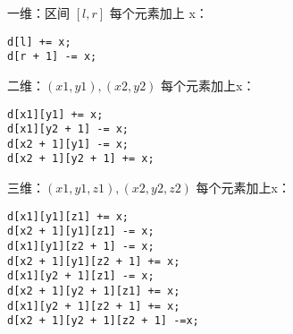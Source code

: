 一维：区间 $[l, r]$ 每个元素加上 x：
\begin{lstlisting}
d[l] += x;
d[r + 1] -= x;
\end{lstlisting}

二维：$(x1, y1), (x2, y2)$ 每个元素加上x：
\begin{lstlisting}
d[x1][y1] += x;
d[x1][y2 + 1] -= x;
d[x2 + 1][y1] -= x;
d[x2 + 1][y2 + 1] += x;
\end{lstlisting}

三维：$(x1, y1, z1), (x2, y2, z2)$ 每个元素加上x：
\begin{lstlisting}
d[x1][y1][z1] += x;
d[x2 + 1][y1][z1] -= x;
d[x1][y1][z2 + 1] -= x;
d[x2 + 1][y1][z2 + 1] += x;
d[x1][y2 + 1][z1] -= x;
d[x2 + 1][y2 + 1][z1] += x;
d[x1][y2 + 1][z2 + 1] += x;
d[x2 + 1][y2 + 1][z2 + 1] -=x;
\end{lstlisting}